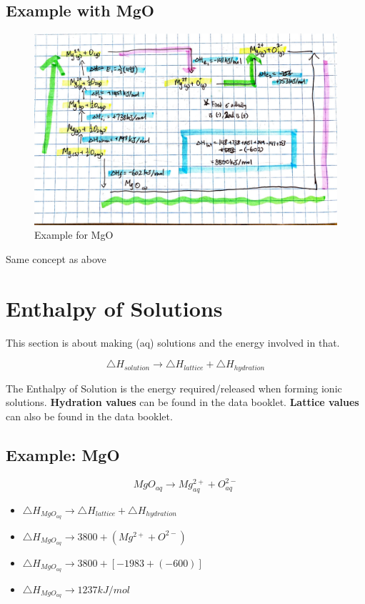 \documentclass[12pt]{article} %
\begin{document}
\subsection{Example with MgO}

\begin{figure}[h]
	\centering
	\includegraphics[width=\textwidth]{../images/1.4fig2.JPG}
	\caption{Example for MgO}
	\label{figure:image1}
\end{figure}

Same concept as above


\pagebreak

\section{Enthalpy of Solutions}

This section is about making (aq) solutions and the energy involved in that.

$$\triangle{H}_{solution} \rightarrow \triangle{H}_{lattice} + \triangle{H}_{hydration}$$

The Enthalpy of Solution is the energy required/released when forming ionic solutions. \textbf{Hydration values} can be found in the data booklet. \textbf{Lattice values} can also be found in the data booklet.


\subsection{Example: MgO}

$$MgO_{aq} \rightarrow Mg^{2+}_{aq} + O^{2-}_{aq}$$
\begin{itemize}
\item $\triangle{H}_{MgO_{aq}} \rightarrow \triangle{H}_{lattice} + \triangle{H}_{hydration}$
\item $\triangle{H}_{MgO_{aq}} \rightarrow 3800 + (Mg^{2+} + O^{2-})$
\item $\triangle{H}_{MgO_{aq}} \rightarrow 3800 + [-1983 + (-600)]$
\item $\triangle{H}_{MgO_{aq}} \rightarrow 1237kJ/mol$
\end{itemize}
\end{document}
